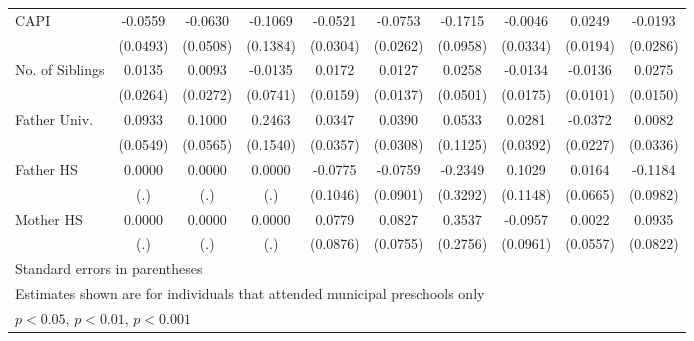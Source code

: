 \begin{table}[htbp]
\begin{tabular}{l*{9}{c}}
\addlinespace
CAPI        &     -0.0559         &     -0.0630         &     -0.1069         &     -0.0521         &     -0.0753\sym{**} &     -0.1715         &     -0.0046         &      0.0249         &     -0.0193         \\
            &    (0.0493)         &    (0.0508)         &    (0.1384)         &    (0.0304)         &    (0.0262)         &    (0.0958)         &    (0.0334)         &    (0.0194)         &    (0.0286)         \\
\addlinespace
No. of Siblings&      0.0135         &      0.0093         &     -0.0135         &      0.0172         &      0.0127         &      0.0258         &     -0.0134         &     -0.0136         &      0.0275         \\
            &    (0.0264)         &    (0.0272)         &    (0.0741)         &    (0.0159)         &    (0.0137)         &    (0.0501)         &    (0.0175)         &    (0.0101)         &    (0.0150)         \\
\addlinespace
Father Univ.&      0.0933         &      0.1000         &      0.2463         &      0.0347         &      0.0390         &      0.0533         &      0.0281         &     -0.0372         &      0.0082         \\
            &    (0.0549)         &    (0.0565)         &    (0.1540)         &    (0.0357)         &    (0.0308)         &    (0.1125)         &    (0.0392)         &    (0.0227)         &    (0.0336)         \\
\addlinespace
Father HS   &      0.0000         &      0.0000         &      0.0000         &     -0.0775         &     -0.0759         &     -0.2349         &      0.1029         &      0.0164         &     -0.1184         \\
            &         (.)         &         (.)         &         (.)         &    (0.1046)         &    (0.0901)         &    (0.3292)         &    (0.1148)         &    (0.0665)         &    (0.0982)         \\
\addlinespace
Mother HS   &      0.0000         &      0.0000         &      0.0000         &      0.0779         &      0.0827         &      0.3537         &     -0.0957         &      0.0022         &      0.0935         \\
            &         (.)         &         (.)         &         (.)         &    (0.0876)         &    (0.0755)         &    (0.2756)         &    (0.0961)         &    (0.0557)         &    (0.0822)         \\
\bottomrule
\multicolumn{10}{l}{\footnotesize Standard errors in parentheses}\\
\multicolumn{10}{l}{\footnotesize Estimates shown are for individuals that attended municipal preschools only}\\
\multicolumn{10}{l}{\footnotesize \sym{*} \(p<0.05\), \sym{**} \(p<0.01\), \sym{***} \(p<0.001\)}\\
\end{tabular}
\end{table}

